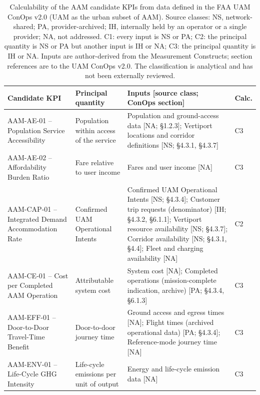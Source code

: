 \begin{table}[!t]
\caption{Calculability of the AAM candidate KPIs from data defined in the FAA UAM ConOps v2.0 (UAM as the urban subset of AAM). Source classes: NS, network-shared; PA, provider-archived; IH, internally held by an operator or a single provider; NA, not addressed. C1: every input is NS or PA; C2: the principal quantity is NS or PA but another input is IH or NA; C3: the principal quantity is IH or NA. Inputs are author-derived from the Measurement Constructs; section references are to the UAM ConOps v2.0. The classification is analytical and has not been externally reviewed.}
\label{tab:calc-aam}
\centering
\footnotesize
\renewcommand{\arraystretch}{1.12}
\begin{tabularx}{\textwidth}{@{}>{\raggedright\arraybackslash}p{}>{\raggedright\arraybackslash}p{}>{\raggedright\arraybackslash}X>{\centering\arraybackslash}p{}@{}}
\toprule
\textbf{Candidate KPI} & \textbf{Principal quantity} & \textbf{Inputs [source class; ConOps section]} & \textbf{Calc.} \\
\midrule
AAM-AE-01 -- Population Service Accessibility & Population within access of the service & Population and ground-access data [NA; \S{}1.2.3]; Vertiport locations and corridor definitions [NS; \S{}4.3.1, \S{}4.3.7] & C3 \\
AAM-AE-02 -- Affordability Burden Ratio & Fare relative to user income & Fares and user income [NA] & C3 \\
AAM-CAP-01 -- Integrated Demand Accommodation Rate & Confirmed UAM Operational Intents & Confirmed UAM Operational Intents [NS; \S{}4.3.4]; Customer trip requests (denominator) [IH; \S{}4.3.2, \S{}6.1.1]; Vertiport resource availability [NS; \S{}4.3.7]; Corridor availability [NS; \S{}4.3.1, \S{}4.4]; Fleet and charging availability [NA] & C2 \\
AAM-CE-01 -- Cost per Completed AAM Operation & Attributable system cost & System cost [NA]; Completed operations (mission-complete indication, archive) [PA; \S{}4.3.4, \S{}6.1.3] & C3 \\
AAM-EFF-01 -- Door-to-Door Travel-Time Benefit & Door-to-door journey time & Ground access and egress times [NA]; Flight times (archived operational data) [PA; \S{}4.3.4]; Reference-mode journey time [NA] & C3 \\
AAM-ENV-01 -- Life-Cycle GHG Intensity & Life-cycle emissions per unit of output & Energy and life-cycle emission data [NA] & C3 \\

\end{tabularx}
\end{table}
